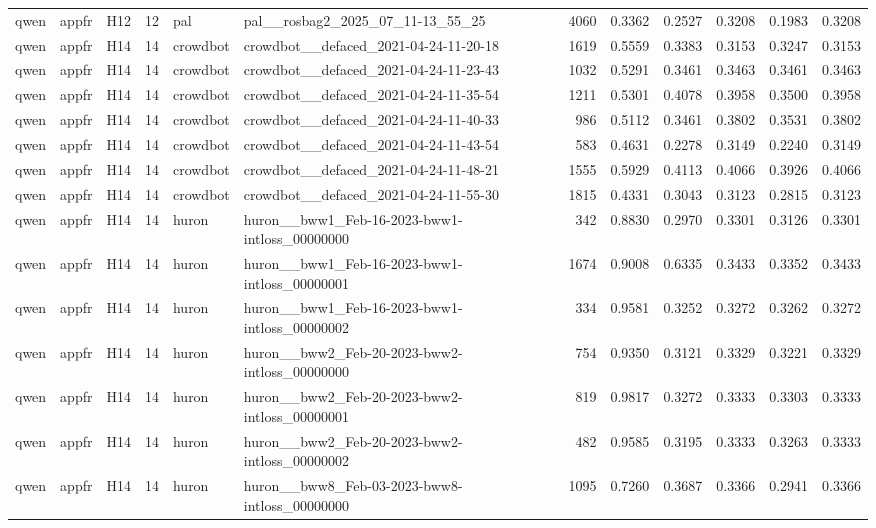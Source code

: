 \begin{table}[tbp]
\begin{tabular}{lllrllrrrrrr}
qwen & appfr & H12 & 12 & pal & pal\_\_rosbag2\_2025\_07\_11-13\_55\_25 & 4060 & 0.3362 & 0.2527 & 0.3208 & 0.1983 & 0.3208 \\
qwen & appfr & H14 & 14 & crowdbot & crowdbot\_\_defaced\_2021-04-24-11-20-18 & 1619 & 0.5559 & 0.3383 & 0.3153 & 0.3247 & 0.3153 \\
qwen & appfr & H14 & 14 & crowdbot & crowdbot\_\_defaced\_2021-04-24-11-23-43 & 1032 & 0.5291 & 0.3461 & 0.3463 & 0.3461 & 0.3463 \\
qwen & appfr & H14 & 14 & crowdbot & crowdbot\_\_defaced\_2021-04-24-11-35-54 & 1211 & 0.5301 & 0.4078 & 0.3958 & 0.3500 & 0.3958 \\
qwen & appfr & H14 & 14 & crowdbot & crowdbot\_\_defaced\_2021-04-24-11-40-33 & 986 & 0.5112 & 0.3461 & 0.3802 & 0.3531 & 0.3802 \\
qwen & appfr & H14 & 14 & crowdbot & crowdbot\_\_defaced\_2021-04-24-11-43-54 & 583 & 0.4631 & 0.2278 & 0.3149 & 0.2240 & 0.3149 \\
qwen & appfr & H14 & 14 & crowdbot & crowdbot\_\_defaced\_2021-04-24-11-48-21 & 1555 & 0.5929 & 0.4113 & 0.4066 & 0.3926 & 0.4066 \\
qwen & appfr & H14 & 14 & crowdbot & crowdbot\_\_defaced\_2021-04-24-11-55-30 & 1815 & 0.4331 & 0.3043 & 0.3123 & 0.2815 & 0.3123 \\
qwen & appfr & H14 & 14 & huron & huron\_\_bww1\_Feb-16-2023-bww1-intloss\_00000000 & 342 & 0.8830 & 0.2970 & 0.3301 & 0.3126 & 0.3301 \\
qwen & appfr & H14 & 14 & huron & huron\_\_bww1\_Feb-16-2023-bww1-intloss\_00000001 & 1674 & 0.9008 & 0.6335 & 0.3433 & 0.3352 & 0.3433 \\
qwen & appfr & H14 & 14 & huron & huron\_\_bww1\_Feb-16-2023-bww1-intloss\_00000002 & 334 & 0.9581 & 0.3252 & 0.3272 & 0.3262 & 0.3272 \\
qwen & appfr & H14 & 14 & huron & huron\_\_bww2\_Feb-20-2023-bww2-intloss\_00000000 & 754 & 0.9350 & 0.3121 & 0.3329 & 0.3221 & 0.3329 \\
qwen & appfr & H14 & 14 & huron & huron\_\_bww2\_Feb-20-2023-bww2-intloss\_00000001 & 819 & 0.9817 & 0.3272 & 0.3333 & 0.3303 & 0.3333 \\
qwen & appfr & H14 & 14 & huron & huron\_\_bww2\_Feb-20-2023-bww2-intloss\_00000002 & 482 & 0.9585 & 0.3195 & 0.3333 & 0.3263 & 0.3333 \\
qwen & appfr & H14 & 14 & huron & huron\_\_bww8\_Feb-03-2023-bww8-intloss\_00000000 & 1095 & 0.7260 & 0.3687 & 0.3366 & 0.2941 & 0.3366 \\

\end{tabular}
\end{table}
